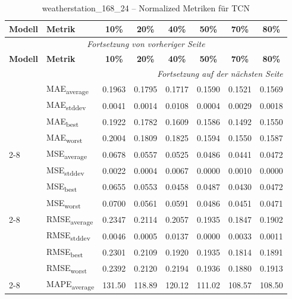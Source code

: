 {\small
\begin{longtable}{l l c c c c c c}
    \toprule
    \textbf{Modell} & \textbf{Metrik} & \textbf{10\%} & \textbf{20\%} & \textbf{40\%} & \textbf{50\%} & \textbf{70\%} & \textbf{80\%} \\
    \midrule
    \endfirsthead
    \multicolumn{8}{c}{\textit{Fortsetzung von vorheriger Seite}} \\
    \toprule
    \textbf{Modell} & \textbf{Metrik} & \textbf{10\%} & \textbf{20\%} & \textbf{40\%} & \textbf{50\%} & \textbf{70\%} & \textbf{80\%} \\
    \midrule
    \endhead
    \midrule
    \multicolumn{8}{r}{\textit{Fortsetzung auf der nächsten Seite}} \\
    \midrule
    \endfoot
    \bottomrule
    \caption{weatherstation_168_24 -- Normalized Metriken für TCN}
    \label{tab:weatherstation_168_24_normalized_tcn}
    \endlastfoot
\multirow{4}{*}{TCN} & MAE\textsubscript{average} & 0.1963 & 0.1795 & 0.1717 & 0.1590 & 0.1521 & 0.1569 \\
 & MAE\textsubscript{stddev} & 0.0041 & 0.0014 & 0.0108 & 0.0004 & 0.0029 & 0.0018 \\
 & MAE\textsubscript{best} & 0.1922 & 0.1782 & 0.1609 & 0.1586 & 0.1492 & 0.1550 \\
 & MAE\textsubscript{worst} & 0.2004 & 0.1809 & 0.1825 & 0.1594 & 0.1550 & 0.1587 \\
\cmidrule(lr){2-8}
\multirow{4}{*}{TCN} & MSE\textsubscript{average} & 0.0678 & 0.0557 & 0.0525 & 0.0486 & 0.0441 & 0.0472 \\
 & MSE\textsubscript{stddev} & 0.0022 & 0.0004 & 0.0067 & 0.0000 & 0.0010 & 0.0000 \\
 & MSE\textsubscript{best} & 0.0655 & 0.0553 & 0.0458 & 0.0487 & 0.0430 & 0.0472 \\
 & MSE\textsubscript{worst} & 0.0700 & 0.0561 & 0.0591 & 0.0486 & 0.0451 & 0.0471 \\
\cmidrule(lr){2-8}
\multirow{4}{*}{TCN} & RMSE\textsubscript{average} & 0.2347 & 0.2114 & 0.2057 & 0.1935 & 0.1847 & 0.1902 \\
 & RMSE\textsubscript{stddev} & 0.0046 & 0.0005 & 0.0137 & 0.0000 & 0.0033 & 0.0011 \\
 & RMSE\textsubscript{best} & 0.2301 & 0.2109 & 0.1920 & 0.1935 & 0.1814 & 0.1891 \\
 & RMSE\textsubscript{worst} & 0.2392 & 0.2120 & 0.2194 & 0.1936 & 0.1880 & 0.1913 \\
\cmidrule(lr){2-8}
\multirow{4}{*}{TCN} & MAPE\textsubscript{average} & 131.50 & 118.89 & 120.12 & 111.02 & 108.57 & 108.50 \\

\end{longtable}}
